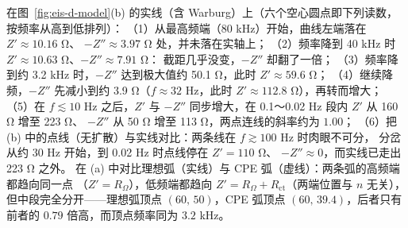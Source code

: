 \begin{obs}
在图~\ref{fig:eis-d-model}(b) 的实线（含 Warburg）上（六个空心圆点即下列读数，
按频率从高到低排列）：
（1）从最高频端（80 kHz）开始，曲线左端落在 $Z'\approx 10.16$ \unit{\ohm}、
$-Z''\approx 3.97$ \unit{\ohm} 处，并未落在实轴上；
（2）频率降到 40 kHz 时 $Z'\approx 10.63$ \unit{\ohm}、$-Z''\approx 7.91$ \unit{\ohm}：
截距几乎没变，$-Z''$ 却翻了一倍；
（3）频率降到约 3.2 kHz 时，$-Z''$ 达到极大值约 50.1 \unit{\ohm}，此时
$Z'\approx 59.6$ \unit{\ohm}；
（4）继续降频，$-Z''$ 先减小到约 3.9 \unit{\ohm}（$f\approx 32$ Hz，此时
$Z'\approx 112.8$ \unit{\ohm}），再转而增大；
（5）在 $f\lesssim 10$ Hz 之后，$Z'$ 与 $-Z''$ 同步增大，在
0.1～0.02 Hz 段内 $Z'$ 从 160 \unit{\ohm} 增至 223 \unit{\ohm}、
$-Z''$ 从 50 \unit{\ohm} 增至 113 \unit{\ohm}，两点连线的斜率约为 $1.00$；
（6）把 (b) 中的点线（无扩散）与实线对比：两条线在 $f\gtrsim 100$ Hz 时肉眼不可分，
分岔从约 30 Hz 开始，到 0.02 Hz 时点线停在 $Z'=110$ \unit{\ohm}、
$-Z''\approx0$，而实线已走出 223 \unit{\ohm} 之外。
在 (a) 中对比理想弧（实线）与 CPE 弧（虚线）：两条弧的高频端都趋向同一点
（$Z'=R_{\Omega}$），低频端都趋向 $Z'=R_{\Omega}+R_{\mathrm{ct}}$（两端位置与 $n$ 无关），
但中段完全分开——理想弧顶点 $(60,\,50)$，CPE 弧顶点 $(60,\,39.4)$，后者只有前者的
$0.79$ 倍高，而顶点频率同为 $3.2$ kHz。
\end{obs}

